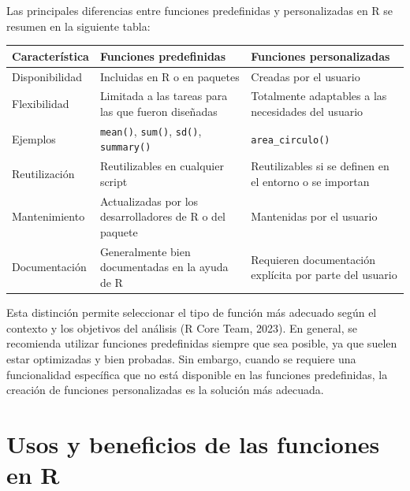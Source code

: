 \documentclass[
  spanish,
  a4paper,
  DIV=11,
  numbers=noendperiod,
  onepage,
  openany]{scrreprt}
\begin{document}
Las principales diferencias entre funciones predefinidas y
personalizadas en R se resumen en la siguiente tabla:

\begin{longtable}[]{@{}
  >{\raggedright\arraybackslash}p{}
  >{\raggedright\arraybackslash}p{}
  >{\raggedright\arraybackslash}p{}@{}}
\toprule\noalign{}
\begin{minipage}[b]{\linewidth}\raggedright
Característica
\end{minipage} & \begin{minipage}[b]{\linewidth}\raggedright
Funciones predefinidas
\end{minipage} & \begin{minipage}[b]{\linewidth}\raggedright
Funciones personalizadas
\end{minipage} \\
\midrule\noalign{}
\endhead
\bottomrule\noalign{}
\endlastfoot
Disponibilidad & Incluidas en R o en paquetes & Creadas por el
usuario \\
Flexibilidad & Limitada a las tareas para las que fueron diseñadas &
Totalmente adaptables a las necesidades del usuario \\
Ejemplos & \texttt{mean()}, \texttt{sum()}, \texttt{sd()},
\texttt{summary()} & \texttt{area\_circulo()} \\
Reutilización & Reutilizables en cualquier script & Reutilizables si se
definen en el entorno o se importan \\
Mantenimiento & Actualizadas por los desarrolladores de R o del paquete
& Mantenidas por el usuario \\
Documentación & Generalmente bien documentadas en la ayuda de R &
Requieren documentación explícita por parte del usuario \\
\end{longtable}

Esta distinción permite seleccionar el tipo de función más adecuado
según el contexto y los objetivos del análisis (R Core Team, 2023). En
general, se recomienda utilizar funciones predefinidas siempre que sea
posible, ya que suelen estar optimizadas y bien probadas. Sin embargo,
cuando se requiere una funcionalidad específica que no está disponible
en las funciones predefinidas, la creación de funciones personalizadas
es la solución más adecuada.

\section{Usos y beneficios de las funciones en
R}\label{usos-y-beneficios-de-las-funciones-en-r}
\end{document}
